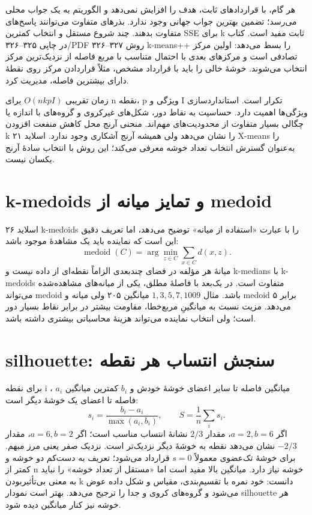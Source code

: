 \documentclass[12pt,a4paper,oneside]{report}
\begin{document}
هر گام، با قراردادهای ثابت، هدف را افزایش نمی‌دهد و الگوریتم به یک جواب محلی می‌رسد؛ تضمین بهترین جواب جهانی وجود ندارد. بذرهای متفاوت می‌توانند پاسخ‌های متفاوت بدهند. چند شروع مستقل و انتخاب کمترین SSE برای k ثابت مفید است. کتاب در چاپی ۳۲۵--۳۲۶/PDF ۳۲۶--۳۲۷ روش k-means++ را بسط می‌دهد: اولین مرکز تصادفی است و مرکزهای بعدی با احتمال متناسب با مربع فاصله از نزدیک‌ترین مرکز انتخاب می‌شوند. خوشهٔ خالی را باید با قرارداد مشخص، مثلاً قراردادن مرکز روی نقطهٔ دارای بیشترین فاصله، مدیریت کرد.

زمان تقریبی \(O(nkpI)\) برای n نقطه، p ویژگی و I تکرار است. استانداردسازی ویژگی‌ها اهمیت دارد. حساسیت به نقاط دور، شکل‌های غیرکروی و گروه‌های با اندازه یا چگالی بسیار متفاوت از محدودیت‌های مهم‌اند. منحنی آرنج محل کاهش منفعت افزودن k را نشان می‌دهد ولی همیشه آرنج آشکاری وجود ندارد. اسلاید ۲۱ X-means را به‌عنوان گسترش انتخاب تعداد خوشه معرفی می‌کند؛ این روش با انتخاب سادهٔ آرنج یکسان نیست.

\section{k-medoids و تمایز میانه از medoid}

اسلاید ۲۶ k-medoids را با عبارت «استفاده از میانه» توضیح می‌دهد، اما تعریف دقیق این است که نماینده باید یک مشاهدهٔ موجود باشد: \[
\operatorname{medoid}(C)=\arg\min_{z\in C}\sum_{x\in C}d(x,z).
\] میانهٔ هر مؤلفه در فضای چندبعدی الزاماً نقطه‌ای از داده نیست و k-medians با k-medoids متفاوت است. در یک‌بعد با فاصلهٔ مطلق، یکی از میانه‌های مشاهده‌شده می‌تواند medoid باشد. مثال \(1,3,5,7,1009\) میانگین ۲۰۵ ولی میانه و medoid برابر ۵ می‌دهد. مزیت نسبت به میانگینِ مربع‌خطا، مقاومت بیشتر در برابر نقاط بسیار دور است؛ ولی انتخاب نماینده می‌تواند هزینهٔ محاسباتی بیشتری داشته باشد.

\section{silhouette: سنجش انتساب هر نقطه}

برای نقطه i ، \(a_i\) میانگین فاصله تا سایر اعضای خوشهٔ خودش و \(b_i\) کمترین میانگین فاصله تا اعضای یک خوشهٔ دیگر است: \[
s_i=\frac{b_i-a_i}{\max(a_i,b_i)},\qquad S=\frac1n\sum_i s_i.
\] اگر \(a=2,b=6\)، مقدار \(2/3\) نشانهٔ انتساب مناسب است؛ اگر \(a=6,b=2\)، مقدار \(-2/3\) نشان می‌دهد نقطه به خوشهٔ دیگر نزدیک‌تر است. نزدیک صفر یعنی مرز مبهم. برای خوشهٔ تک‌عضوی معمولاً $s=0$ قرارداد می‌شود؛ تعریف به دست‌کم دو خوشه و کمتر از n خوشه نیاز دارد. میانگین بالا مفید است اما «مستقل از تعداد خوشه» را نباید به معنی بی‌تأثیربودن k دانست: خود نمره با تقسیم‌بندی، مقیاس و شکل داده عوض می‌شود و گروه‌های کروی و جدا را ترجیح می‌دهد. بهتر است نمودار silhouette هر خوشه نیز کنار میانگین دیده شود.
\end{document}
